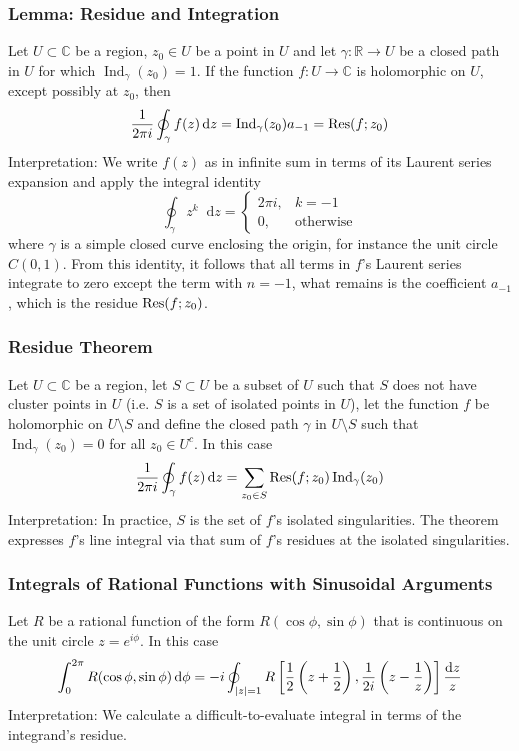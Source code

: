 \documentclass[11pt, a4paper]{article}
\newcommand{\diff}{\mathop{}\!\mathrm{d}} %
\newcommand{\R}{\mathbb{R}} %
\newcommand{\C}{\mathbb{C}} %
\begin{document}
\subsubsection{Lemma: Residue and Integration}
Let $ U \subset \C $ be a region, $ z_0 \in U $ be a point in $ U $ and let $ \gamma : \R \to U $ be a closed path in $ U $ for which $ \operatorname{Ind}_{\gamma}(z_0) = 1$. If the function $ f : U \to \C $ is holomorphic on $ U $, except possibly at $ z_0 $, then
\begin{align*}
	\frac{1}{2\pi i}\oint_{\gamma}f(z)\diff z = \operatorname{Ind}_{\gamma}(z_0) a_{-1} = \Res(f; z_0)
\end{align*}
Interpretation: We write $ f(z) $ as in infinite sum in terms of its Laurent series expansion and apply the integral identity
\[
	\oint_{\gamma}z^{k} \diff z = 
	\begin{cases}
		2\pi i, & k = -1\\
		0, & \text{otherwise}
	\end{cases}
\]
where $ \gamma $ is a simple closed curve enclosing the origin, for instance the unit circle $ C(0, 1) $. From this identity, it follows that all terms in $ f $'s Laurent series integrate to zero except the term with $ n = -1 $, what remains is the coefficient $ a_{-1} $, which is the residue $ \Res(f; z_0) $.


\subsubsection{Residue Theorem}
Let $ U \subset \C $ be a region, let $ S \subset U $ be a subset of $ U $ such that $ S $ does not have cluster points in $ U $ (i.e. $ S $ is a set of isolated points in $ U $), let the function $ f $ be holomorphic on $ U \setminus S $ and define the closed path $ \gamma $ in $ U \setminus S $ such that $ \operatorname{Ind}_{\gamma}(z_0) = 0$ for all $ z_0 \in U^{c} $. In this case
\begin{align*}
	\frac{1}{2\pi i} \oint_{\gamma}f(z) \diff z = \sum_{z_0 \in S} \Res(f; z_0) \operatorname{Ind}_{\gamma}(z_0)
\end{align*}
Interpretation: In practice, $ S $ is the set of $ f $'s isolated singularities. The theorem expresses $ f $'s line integral via that sum of $ f $'s residues at the isolated singularities.


\subsubsection{Integrals of Rational Functions with Sinusoidal Arguments}
Let $ R $ be a rational function of the form $ R(\cos \phi, \sin \phi) $ that is continuous on the unit circle $ z = e^{i\phi} $. In this case
\begin{align*}
	\int_{0}^{2\pi}R(\cos \phi, \sin \phi) \diff \phi = -i \oint_{\abs{z}=1} R\left [\frac{1}{2}\left (z + \frac{1}{2}\right ), \frac{1}{2i} \left(z - \frac{1}{z}\right)\right]\frac{\diff z}{z}
\end{align*}
Interpretation: We calculate a difficult-to-evaluate integral in terms of the integrand's residue.
\end{document}

